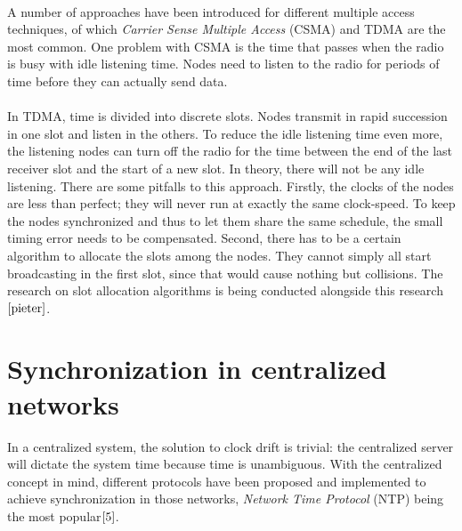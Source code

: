 \documentclass[a4paper,10pt]{report}
\begin{document}
\paragraph*{}
A number of approaches have been introduced for different multiple access techniques, of which \textit{Carrier Sense Multiple Access} (CSMA) and TDMA are the most common. One problem with CSMA is the time that passes when the radio is busy with idle listening time. Nodes need to listen to the radio for periods of time before they can actually send data.
\paragraph*{}
In TDMA, time is divided into discrete slots. Nodes transmit in rapid succession in one slot and listen in the others. To
reduce the idle listening time even more, the listening nodes can turn off the radio for the time between the end of the last receiver slot
and the start of a new slot. In theory, there will not be any idle listening. There are some pitfalls to this approach. Firstly, the
clocks of the nodes are less than perfect; they will never run at exactly the same clock-speed. To keep the nodes synchronized and
thus to let them share the same schedule, the small timing error needs to be compensated. Second, there has to be a certain algorithm
to allocate the slots among the nodes. They cannot simply all start broadcasting in the first slot, since that would cause nothing but
collisions. The research on slot allocation algorithms is being conducted alongside this research$\cite{pieter}$.
\section{\textbf{Synchronization in centralized networks}}
In a centralized system, the solution to clock drift is trivial: the centralized server will dictate the system time because time is unambiguous. With the centralized concept in mind, different protocols have been proposed and implemented to achieve synchronization in those networks, \textit{Network Time Protocol} (NTP) being the most popular$\cite{5}$.
\end{document}
